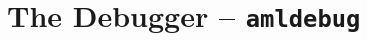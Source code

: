
\chapter[The Debugger -- amldebug]{The Debugger -- \lstinline!amldebug!}
\label{sec:tools-amldebug}








